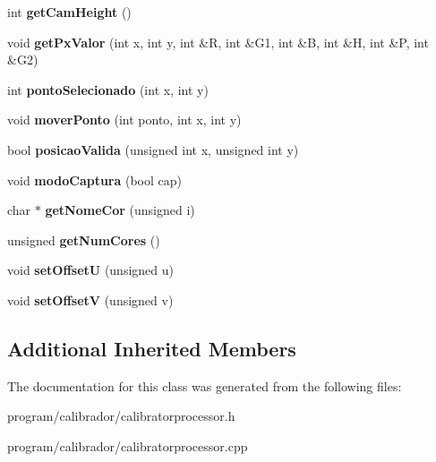 \begin{DoxyCompactItemize}
\item 
int {\bfseries get\+Cam\+Height} ()\hypertarget{classCalibratorProcessor_a5c60dbf4db7edaf9555a4d2f95f0dda3}{}\label{classCalibratorProcessor_a5c60dbf4db7edaf9555a4d2f95f0dda3}

\item 
void {\bfseries get\+Px\+Valor} (int x, int y, int \&R, int \&G1, int \&B, int \&H, int \&P, int \&G2)\hypertarget{classCalibratorProcessor_a558f812c6764a7b430e648b86d1a0292}{}\label{classCalibratorProcessor_a558f812c6764a7b430e648b86d1a0292}

\item 
int {\bfseries ponto\+Selecionado} (int x, int y)\hypertarget{classCalibratorProcessor_a55d8bd69e7cb6fee74649827ab12c22c}{}\label{classCalibratorProcessor_a55d8bd69e7cb6fee74649827ab12c22c}

\item 
void {\bfseries mover\+Ponto} (int ponto, int x, int y)\hypertarget{classCalibratorProcessor_a449e71044ac9fb28f5f7c2f38422d684}{}\label{classCalibratorProcessor_a449e71044ac9fb28f5f7c2f38422d684}

\item 
bool {\bfseries posicao\+Valida} (unsigned int x, unsigned int y)\hypertarget{classCalibratorProcessor_a634760c5e5b3513c12293ea56b6ee9bf}{}\label{classCalibratorProcessor_a634760c5e5b3513c12293ea56b6ee9bf}

\item 
void {\bfseries modo\+Captura} (bool cap)\hypertarget{classCalibratorProcessor_a2b7ead77519d23cecdf27897c650d806}{}\label{classCalibratorProcessor_a2b7ead77519d23cecdf27897c650d806}

\item 
char $\ast$ {\bfseries get\+Nome\+Cor} (unsigned i)\hypertarget{classCalibratorProcessor_a2982f92bb6ef7da7659ef0aa0ca34b0a}{}\label{classCalibratorProcessor_a2982f92bb6ef7da7659ef0aa0ca34b0a}

\item 
unsigned {\bfseries get\+Num\+Cores} ()\hypertarget{classCalibratorProcessor_abe2a64cf9aed55af40f8206b085edcb0}{}\label{classCalibratorProcessor_abe2a64cf9aed55af40f8206b085edcb0}

\item 
void {\bfseries set\+OffsetU} (unsigned u)\hypertarget{classCalibratorProcessor_a13297f7259f12141143a8dc5b79495e2}{}\label{classCalibratorProcessor_a13297f7259f12141143a8dc5b79495e2}

\item 
void {\bfseries set\+OffsetV} (unsigned v)\hypertarget{classCalibratorProcessor_abf4736a5532a342a4a442d1f2581a64b}{}\label{classCalibratorProcessor_abf4736a5532a342a4a442d1f2581a64b}

\end{DoxyCompactItemize}
\subsection*{Additional Inherited Members}


The documentation for this class was generated from the following files\+:\begin{DoxyCompactItemize}
\item 
program/calibrador/calibratorprocessor.\+h\item 
program/calibrador/calibratorprocessor.\+cpp\end{DoxyCompactItemize}
